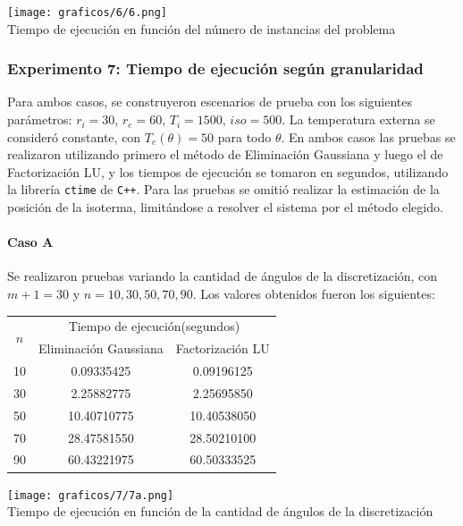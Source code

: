     \begin{center}
      \texttt{[image: graficos/6/6.png]} \\
      {\small Tiempo de ejecución en función del número de instancias del problema}
    \end{center}

  \subsubsection*{Experimento 7: Tiempo de ejecución según granularidad}

    Para ambos casos, se construyeron escenarios de prueba con los siguientes parámetros: $r_i = 30$, $r_e = 60$, $T_i = 1500$, $iso = 500$. La temperatura externa se consideró constante, con $T_e(\theta) = 50$ para todo $\theta$. En ambos casos las pruebas se realizaron utilizando primero el método de Eliminación Gaussiana y luego el de Factorización LU, y los tiempos de ejecución se tomaron en segundos, utilizando la librería \texttt{ctime} de \texttt{C++}. Para las pruebas se omitió realizar la estimación de la posición de la isoterma, limitándose a resolver el sistema por el método elegido.

    \paragraph{Caso A}
      Se realizaron pruebas variando la cantidad de ángulos de la discretización, con $m + 1 = 30$ y $n = 10, 30, 50, 70, 90$. Los valores obtenidos fueron los siguientes:

      \begin{center}
        \begin{tabular}{c|c|c}
          \multirow{2}{*}{$n$} & \multicolumn{2}{c}{Tiempo de ejecución(segundos)} \\ 
          & Eliminación Gaussiana & Factorización LU \\ \hline
          10 & 0.09335425 & 0.09196125 \\
          30 & 2.25882775 & 2.25695850 \\
          50 & 10.40710775 & 10.40538050 \\
          70 & 28.47581550 & 28.50210100 \\
          90 & 60.43221975 & 60.50333525 \\
        \end{tabular}
      \end{center}

      \begin{center}
        \texttt{[image: graficos/7/7a.png]} \\
        {\small Tiempo de ejecución en función de la cantidad de ángulos de la discretización}
      \end{center}

